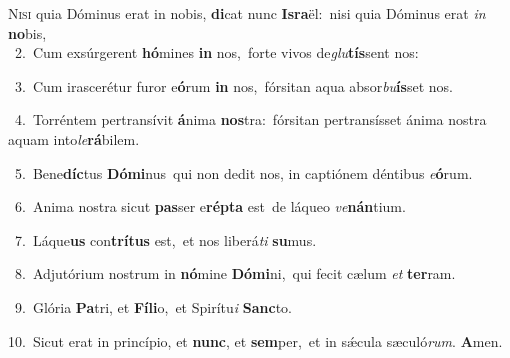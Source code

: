 \lettrine{\initial\textcolor{\initialcolor}{N}}{isi} quia Dóminus erat in nobis, \textbf{di}\-cat nunc \textbf{Is}\-\textbf{ra}ël:~\star nisi quia Dóminus erat \textit{in} \textbf{no}\-bis,\\
{\numbfont\textcolor{\numbcolor}{~2.}}~Cum exsúrgerent \textbf{hó}\-mines \textbf{in} nos,~\star forte vivos de\-\textit{glu}\-\textbf{tís}sent nos:\par
{\numbfont\textcolor{\numbcolor}{~3.}}~Cum irascerétur furor e\-\textbf{ó}\-rum \textbf{in} nos,~\star fórsitan aqua absor\-\textit{bu}\-\textbf{ís}set nos.\par
{\numbfont\textcolor{\numbcolor}{~4.}}~Torréntem pertransívit \textbf{á}\-nima \textbf{nos}\-tra:~\star fórsitan pertransísset ánima nostra aquam into\-\textit{le}\-\textbf{rá}bilem.\par
{\numbfont\textcolor{\numbcolor}{~5.}}~Bene\-\textbf{díc}\-tus \textbf{Dó}\-\textbf{mi}nus~\star qui non dedit nos, in captiónem déntibus \textit{e}\-\textbf{ó}rum.\par
{\numbfont\textcolor{\numbcolor}{~6.}}~Anima nostra sicut \textbf{pas}\-ser e\-\textbf{rép}\-\textbf{ta} est~\star de láqueo \textit{ve}\-\textbf{nán}tium.\par
{\numbfont\textcolor{\numbcolor}{~7.}}~Láque\textbf{us} con\-\textbf{trí}\-\textbf{tus} est,~\star et nos liberá\textit{ti} \textbf{su}\-mus.\par
{\numbfont\textcolor{\numbcolor}{~8.}}~Adjutórium nostrum in \textbf{nó}\-mine \textbf{Dó}\-\textbf{mi}ni,~\star qui fecit cælum \textit{et} \textbf{ter}\-ram.\par
{\numbfont\textcolor{\numbcolor}{~9.}}~Glória \textbf{Pa}\-tri, et \textbf{Fí}\-\textbf{li}o,~\star et Spirítu\textit{i} \textbf{Sanc}\-to.\par
{\numbfont\textcolor{\numbcolor}{10.}}~Sicut erat in princípio, et \textbf{nunc}\-, et \textbf{sem}\-per,~\star et in sǽcula sæculó\-\textit{rum}\-. \textbf{A}\-men.\par

